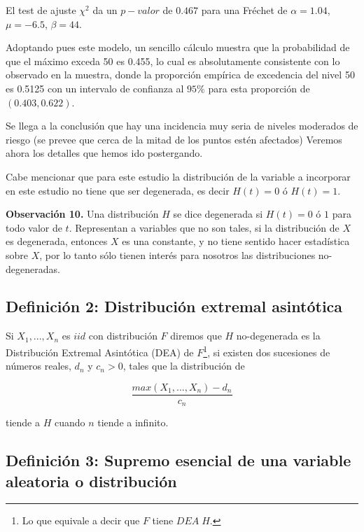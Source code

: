 \documentclass[
  oneside]{book}
\begin{document}
El test de ajuste \(\chi^2\) da un \(p-valor\) de \(0.467\) para una
Fréchet de \(\alpha=1.04\), \(\mu= -6.5\), \(\beta=44\).

Adoptando pues este modelo, un sencillo cálculo muestra que la
probabilidad de que el máximo exceda 50 es 0.455, lo cual es
absolutamente consistente con lo observado en la muestra, donde la
proporción empírica de excedencia del nivel 50 es 0.5125 con un
intervalo de confianza al \(95\%\) para esta proporción de
\((0.403, 0.622)\).

Se llega a la conclusión que hay una incidencia muy seria de niveles
moderados de riesgo (se prevee que cerca de la mitad de los puntos estén
afectados) Veremos ahora los detalles que hemos ido postergando.

Cabe mencionar que para este estudio la distribución de la variable a
incorporar en este estudio no tiene que ser degenerada, es decir
\(H(t)=0\) ó \(H(t)=1\).

\textbf{Observación 10.} Una distribución \(H\) se dice degenerada si
\(H(t)=0\) ó \(1\) para todo valor de \(t\). Representan a variables que
no son tales, si la distribución de \(X\) es degenerada, entonces \(X\)
es una constante, y no tiene sentido hacer estadística sobre \(X\), por
lo tanto sólo tienen interés para nosotros las distribuciones
no-degeneradas.

\newpage

\hypertarget{definiciuxf3n-2-distribuciuxf3n-extremal-asintuxf3tica}{%
\subsection{Definición 2: Distribución extremal
asintótica}\label{definiciuxf3n-2-distribuciuxf3n-extremal-asintuxf3tica}}

Si \(X_1,...,X_n\) es \(iid\) con distribución \(F\) diremos que \(H\)
no-degenerada es la Distribución Extremal Asintótica (DEA) de
\(F\)\footnote{Lo que equivale a decir que $F$ tiene $DEA\;H$.}, si
existen dos sucesiones de números reales, \(d_n\) y \(c_n>0\), tales que
la distribución de

\begin{equation}
\frac{max(X_1,...,X_n)- d_n}{c_n}\label{eq:max}
\end{equation}

tiende a \(H\) cuando \(n\) tiende a infinito.

\hypertarget{definiciuxf3n-3-supremo-esencial-de-una-variable-aleatoria-o-distribuciuxf3n}{%
\subsection{Definición 3: Supremo esencial de una variable aleatoria o
distribución}\label{definiciuxf3n-3-supremo-esencial-de-una-variable-aleatoria-o-distribuciuxf3n}}
\end{document}
